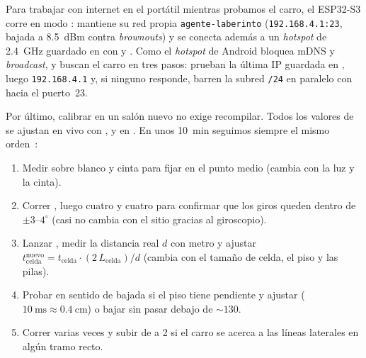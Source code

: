 Para trabajar con internet en el portátil mientras probamos el carro, el ESP32-S3 corre en modo : mantiene su red propia \texttt{agente-laberinto} (\texttt{192.168.4.1:23}, bajada a \SI{8.5}{dBm} contra \emph{brownouts}) y se conecta además a un \emph{hotspot} de \SI{2.4}{\giga\hertz} guardado en  con  y . Como el \emph{hotspot} de Android bloquea mDNS y \emph{broadcast},  y  buscan el carro en tres pasos: prueban la última IP guardada en , luego \texttt{192.168.4.1} y, si ninguno responde, barren la subred \texttt{/24} en paralelo con  hacia el puerto~23.

Por último, calibrar en un salón nuevo no exige recompilar. Todos los valores de  se ajustan en vivo con ,  y  en . En unos \SI{10}{\minute} seguimos siempre el mismo orden~\cite{handoff2026doc}:
\begin{enumerate}[leftmargin=1.4em]
  \item Medir  sobre blanco y cinta para fijar  en el punto medio (cambia con la luz y la cinta).
  \item Correr , luego cuatro  y cuatro  para confirmar que los giros queden dentro de $\pm 3\text{--}4^\circ$ (casi no cambia con el sitio gracias al giroscopio).
  \item Lanzar , medir la distancia real $d$ con metro y ajustar $t_{\text{celda}}^{\text{nuevo}} = t_{\text{celda}} \cdot (2\,L_{\text{celda}}) / d$ (cambia con el tamaño de celda, el piso y las pilas).
  \item Probar  en sentido de bajada si el piso tiene pendiente y ajustar  ($\SI{10}{\milli\second}\approx\SI{0.4}{\centi\meter}$) o bajar  sin pasar debajo de $\sim 130$.
  \item Correr  varias veces y subir  de a 2 si el carro se acerca a las líneas laterales en algún tramo recto.
\end{enumerate}
